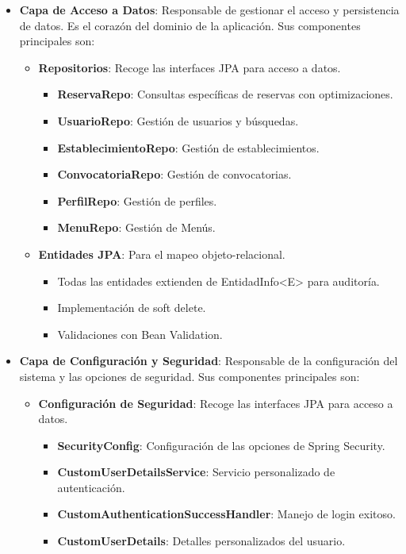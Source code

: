 \begin{itemize}
	\item \textbf{Capa de Acceso a Datos}: Responsable de gestionar el acceso y persistencia de datos. Es el corazón del dominio de la aplicación. Sus componentes principales son:
    	\begin{itemize}
            \item \textbf{Repositorios}: Recoge las interfaces JPA para acceso a datos.
        	\begin{itemize}
                \item \textbf{ReservaRepo}: Consultas específicas de reservas con optimizaciones.
                \item \textbf{UsuarioRepo}: Gestión de usuarios y búsquedas.
                \item \textbf{EstablecimientoRepo}: Gestión de establecimientos.
                \item \textbf{ConvocatoriaRepo}: Gestión de convocatorias.
                \item \textbf{PerfilRepo}: Gestión de perfiles.
                \item \textbf{MenuRepo}: Gestión de Menús.
             \end{itemize}

            \item \textbf{Entidades JPA}: Para el mapeo objeto-relacional.
        	\begin{itemize}
                \item Todas las entidades extienden de EntidadInfo<E> para auditoría.
                \item Implementación de soft delete.
                \item Validaciones con Bean Validation.
             \end{itemize}
         \end{itemize}

	\item \textbf{Capa de Configuración y Seguridad}: Responsable de la configuración del sistema y las opciones de seguridad. Sus componentes principales son:
    	\begin{itemize}
            \item \textbf{Configuración de Seguridad}: Recoge las interfaces JPA para acceso a datos.
        	\begin{itemize}
                \item \textbf{SecurityConfig}: Configuración de las opciones de Spring Security.
                \item \textbf{CustomUserDetailsService}: Servicio personalizado de autenticación.
                \item \textbf{CustomAuthenticationSuccessHandler}: Manejo de login exitoso.
                \item \textbf{CustomUserDetails}: Detalles personalizados del usuario.
             \end{itemize}


\end{itemize}
\end{itemize}
